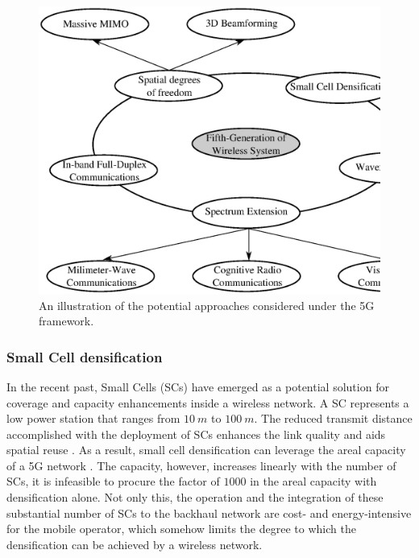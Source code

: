 \begin{figure}
\centering
\includegraphics[width = 0.98 \columnwidth]{figures/5G}
\caption{An illustration of the potential approaches considered under the 5G framework.}
\label{fig_Int:5G}
\end{figure}


\subsubsection*{Small Cell densification}

In the recent past, Small Cells (SCs) have emerged as a potential solution for coverage and capacity enhancements inside a wireless network. A SC represents a low power station that ranges from $\SI{10}{m}$ to $\SI{100}{m}$. The reduced transmit distance accomplished with the deployment of SCs enhances the link quality and aids spatial reuse \cite{Chander08}.
As a result, small cell densification can leverage the areal capacity of a 5G network \cite{Andrews14}. The capacity, however, increases linearly with the number of SCs, it is infeasible to procure the factor of $1000$ in the areal capacity with densification alone. Not only this, the operation and the integration of these substantial number of SCs to the backhaul network are cost- and energy-intensive for the mobile operator, which somehow limits the degree to which the densification can be achieved by a wireless network.





